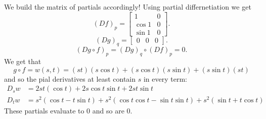 \documentclass[letter]{article}
\newenvironment{menumerate}{%
  \edef\backupindent{\the\parindent}%
  \enumerate%
  \setlength{\parindent}{\backupindent}%
}{\endenumerate}
\begin{document}
\begin{menumerate}
             We build the matrix of partials accordingly! 
            Using partial differnetiation we get 
            \begin{equation}
                (Df)_p = \left[
                \begin{array}{cc}
                    1 & 0 \\
                    \cos 1 & 0 \\
                    \sin 1 & 0
                \end{array}
                \right].
            \end{equation}
        \begin{equation}
                (Dg)_q = \left[
                \begin{array}{ccc}
                     0 & 0 & 0
                \end{array}
                \right].
            \end{equation}
         \begin{equation}
            (Dg\circ f)_p = (Dg)_q\circ (Df)_p = 0.
            \end{equation}
        We get that 
        \begin{equation}
            g \circ f = w(s,t) = (st)(s\cos t) + (s\cos t) (s \sin t) + (s \sin t)(st)       
        \end{equation}
        and so the pial derivatives at least contain $s$ in every term:
        \begin{equation}
        \begin{aligned}
            D_s w &= 2st(\cos t) + 2s \cos t \sin t + 2s t \sin t \\
            D_t w &= s^2(\cos t - t\sin t) + s^2(\cos t \cos t - \sin t \sin t) + s^2 (\sin t + t \cos t)
         \end{aligned} 
        \end{equation}
        These partials evaluate to 0 and so are 0.


\end{menumerate}
\end{document}
